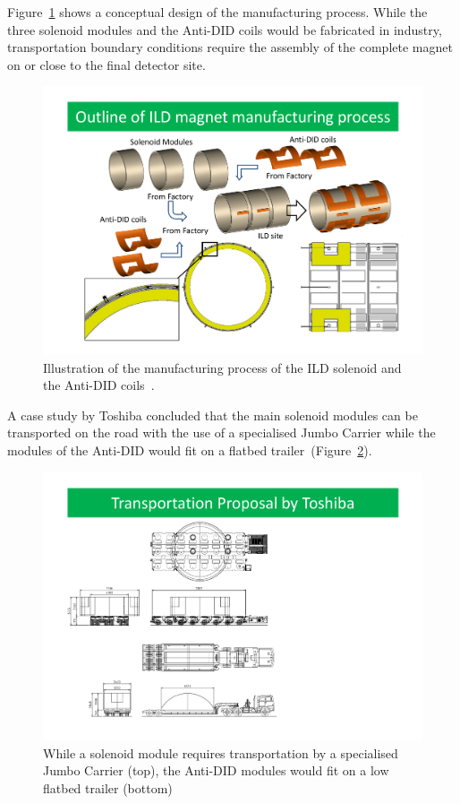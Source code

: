 Figure~\ref{ILD:fig:solenoid_manufacturing} shows a conceptual design of the manufacturing process. While the three solenoid modules and the Anti-DID coils would be fabricated in industry, transportation boundary conditions require the assembly of the complete magnet on or close to the final detector site.
\begin{figure}[h!]
    \centering
    \includegraphics[width=0.8\hsize]{Integration/fig/Solenoid_Manufacturing.pdf}
    \caption{Illustration of the manufacturing process of the ILD solenoid and the Anti-DID coils~\cite{ild:bib:Solenoid_Manufacturing}.}
    \label{ILD:fig:solenoid_manufacturing}
\end{figure}
A case study by Toshiba concluded that the main solenoid modules can be transported on the road with the use of a specialised Jumbo Carrier while the modules of the Anti-DID would fit on a flatbed trailer~(Figure~\ref{ILD:fig:magnet_transport}).
\begin{figure}[h!]
    \centering
    \includegraphics[width=0.8\hsize]{Integration/fig/Magnet_Transport.pdf}
    \caption{While a solenoid module requires transportation by a specialised Jumbo Carrier (top), the Anti-DID modules would fit on a low flatbed trailer (bottom)~\cite{ild:bib:Solenoid_Manufacturing}}
    \label{ILD:fig:magnet_transport}
\end{figure}

